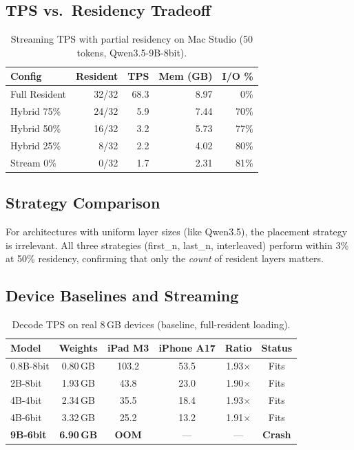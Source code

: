 \documentclass[10pt,a4paper]{article}
\begin{document}
\subsection{TPS vs.\ Residency Tradeoff}

\begin{table}[ht!]
\centering\small
\caption{Streaming TPS with partial residency on Mac Studio (50 tokens, Qwen3.5-9B-8bit).}
\label{tab:streaming}
\begin{tabular}{lrrrr}
\toprule
\textbf{Config} & \textbf{Resident} & \textbf{TPS} & \textbf{Mem (GB)} & \textbf{I/O \%} \\
\midrule
Full Resident  & 32/32 &  68.3 & 8.97 &  0\% \\
Hybrid 75\%    & 24/32 &   5.9 & 7.44 & 70\% \\
Hybrid 50\%    & 16/32 &   3.2 & 5.73 & 77\% \\
Hybrid 25\%    &  8/32 &   2.2 & 4.02 & 80\% \\
Stream 0\%     &  0/32 &   1.7 & 2.31 & 81\% \\
\bottomrule
\end{tabular}
\end{table}

\subsection{Strategy Comparison}

For architectures with uniform layer sizes (like Qwen3.5), the placement strategy is irrelevant. All three strategies (first\_n, last\_n, interleaved) perform within 3\% at 50\% residency, confirming that only the \emph{count} of resident layers matters.

\subsection{Device Baselines and Streaming}

\begin{table}[ht!]
\centering\small
\caption{Decode TPS on real 8\,GB devices (baseline, full-resident loading).}
\label{tab:device}
\begin{tabular}{lccccc}
\toprule
\textbf{Model} & \textbf{Weights} & \textbf{iPad M3} & \textbf{iPhone A17} & \textbf{Ratio} & \textbf{Status} \\
\midrule
0.8B-8bit & 0.80\,GB & 103.2 & 53.5 & 1.93$\times$ & Fits \\
2B-8bit   & 1.93\,GB &  43.8 & 23.0 & 1.90$\times$ & Fits \\
4B-4bit   & 2.34\,GB &  35.5 & 18.4 & 1.93$\times$ & Fits \\
4B-6bit   & 3.32\,GB &  25.2 & 13.2 & 1.91$\times$ & Fits \\
\textbf{9B-6bit} & \textbf{6.90\,GB} & \textbf{OOM} & --- & --- & \textbf{Crash} \\
\bottomrule
\end{tabular}
\end{table}
\end{document}
